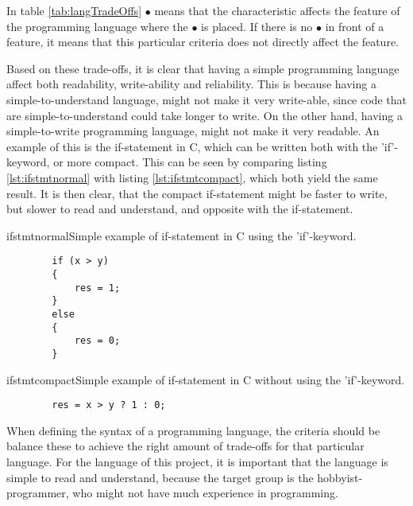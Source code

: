 In table \ref{tab:langTradeOffs} $\bullet$ means that the characteristic affects the feature of the programming language where the $\bullet$ is placed. If there is no $\bullet$ in front of a feature, it means that this particular criteria does not directly affect the feature. 

Based on these trade-offs, it is clear that having a simple programming language affect both readability, write-ability and reliability. 
This is because having a simple-to-understand language, might not make it very write-able, since code that are simple-to-understand could take longer to write. 
On the other hand, having a simple-to-write programming language, might not make it very readable. An example of this is the if-statement in C, which can be written both with the 'if'-keyword, or more compact. This can be seen by comparing listing \ref{lst:ifstmtnormal} with listing \ref{lst:ifstmtcompact}, which both yield the same result. It is then clear, that the compact if-statement might be faster to write, but slower to read and understand, and opposite with the if-statement.

\begin{code}{ifstmtnormal}{Simple example of if-statement in C using the 'if'-keyword.}
	\begin{lstlisting}
		if (x > y)
		{
    		res = 1;
		}
		else
		{
    		res = 0;
		}
	\end{lstlisting}
\end{code}

\begin{code}{ifstmtcompact}{Simple example of if-statement in C without using the 'if'-keyword.}
	\begin{lstlisting}
		res = x > y ? 1 : 0;
	\end{lstlisting}
\end{code}

When defining the syntax of a programming language, the criteria should be balance these to achieve the right amount of trade-offs for that particular language. For the language of this project, it is important that the language is simple to read and understand, because the target group is the hobbyist-programmer, who might not have much experience in programming.


